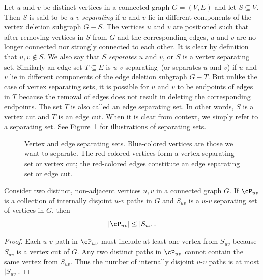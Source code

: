 Let $u$ and $v$ be distinct vertices in a connected graph $G = (V,E)$
and let $S \subseteq V$. Then $S$ is said to be $u$-$v$
\emph{separating} if $u$ and $v$ lie in different components of the
vertex deletion subgraph $G - S$. The vertices $u$ and $v$ are
positioned such that after removing vertices in $S$ from $G$ and the
corresponding edges, $u$ and $v$ are no longer connected nor strongly
connected to each other. It is clear by definition that
$u,v \notin S$. We also say that $S$ \emph{separates} $u$ and
$v$, or $S$ is a vertex separating set. Similarly an edge set
$T \subseteq E$ is $u$-$v$ separating~(or separates $u$ and $v$) if
$u$ and $v$ lie in different components of the edge deletion subgraph
$G - T$. But unlike the case of vertex separating sets, it is possible
for $u$ and $v$ to be endpoints of edges in $T$ because the removal of
edges does not result in deleting the corresponding endpoints. The set
$T$ is also called an edge separating set. In other words, $S$ is a
vertex cut and $T$ is an edge
cut. When it is clear from context, we simply refer to
a separating set. See
Figure~\ref{fig:distance_connectivity:vertex_edge_separating_sets} for
illustrations of separating sets.

\begin{figure}[!htbp]
\centering
{}

\caption{Vertex and edge separating sets. Blue-colored vertices are
  those we want to separate. The red-colored vertices form a vertex
  separating set or vertex cut; the red-colored
  edges constitute an edge separating set or edge cut.}
\label{fig:distance_connectivity:vertex_edge_separating_sets}
\end{figure}

\begin{proposition}
Consider two distinct, non-adjacent vertices $u,v$ in a connected
graph $G$. If $\cP_{uv}$ is a collection of internally disjoint
$u$-$v$ paths in $G$ and $S_{uv}$ is a $u$-$v$ separating set of
vertices in $G$, then
\begin{equation}
\label{eqn:distance_connectivity:upper_bound_internally_disjoint_paths}
|\cP_{uv}| \leq |S_{uv}|.
\end{equation}
\end{proposition}

\begin{proof}
Each $u$-$v$ path in $\cP_{uv}$ must include at least one vertex from
$S_{uv}$ because $S_{uv}$ is a vertex cut of $G$. Any two distinct
paths in $\cP_{uv}$ cannot contain the same vertex from $S_{uv}$. Thus
the number of internally disjoint $u$-$v$ paths is at most $|S_{uv}|$.
\end{proof}

